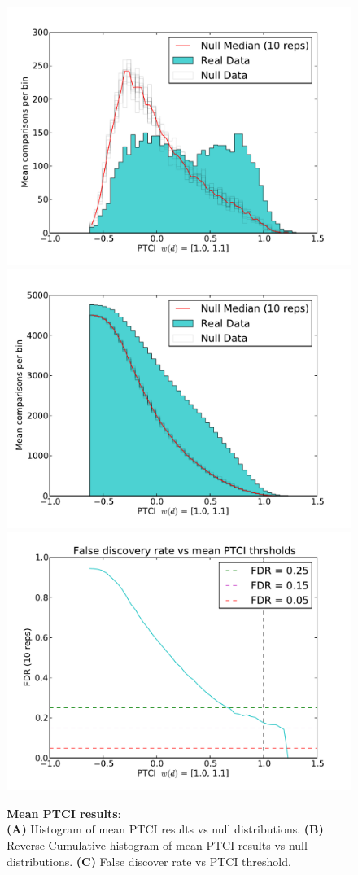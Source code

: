 
\begin{figure}[hp]
%
\subcaptionbox{\label{fig:mean-ptci-hists-base}}
{\includegraphics[width=.5\linewidth]{figures/figs/ecr_team_ptci/mean_ptci_hist.pdf}}
% 
\subcaptionbox{\label{fig:mean-ptci-hists-rcum-hist}}
{\includegraphics[width=.5\linewidth]{figures/figs/ecr_team_ptci/mean_ptci_cum_hist.pdf}}
% 
\subcaptionbox{\label{fig:mean-ptci-hists-fdr}}
{\includegraphics[width=.5\linewidth]{figures/figs/ecr_team_ptci/mean_ptci_fdr.pdf}}
% 
% 
\caption[Mean PTCI results]{\sf \textbf{Mean PTCI results}:\\
\textbf{(A)} Histogram of mean PTCI results vs null distributions.
\textbf{(B)} Reverse Cumulative histogram of mean PTCI results vs null distributions.
\textbf{(C)} False discover rate vs PTCI threshold.}
\label{fig:mean-ptci-hists}
\end{figure}